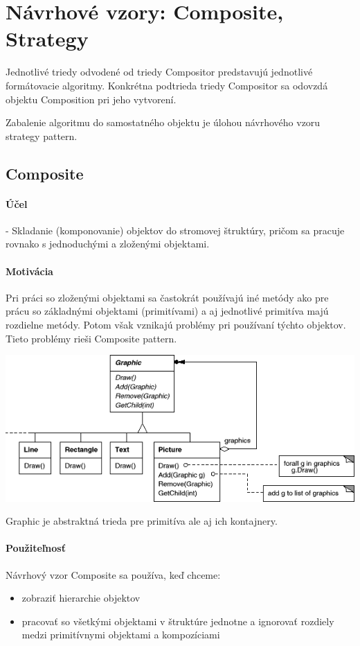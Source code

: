 \section{Návrhové vzory: Composite, Strategy}

Jednotlivé triedy odvodené od triedy Compositor predstavujú jednotlivé formátovacie algoritmy. Konkrétna podtrieda triedy Compositor sa odovzdá objektu Composition pri jeho vytvorení.

Zabalenie algoritmu do samostatného objektu je úlohou návrhového vzoru strategy pattern.
	\subsection{Composite}
		\paragraph{Účel}
			 - Skladanie (komponovanie) objektov do stromovej štruktúry, pričom sa pracuje rovnako s jednoduchými a zloženými objektami.

		\paragraph{Motivácia}
		Pri práci so zloženými objektami sa častokrát používajú iné metódy ako pre prácu so základnými objektami (primitívami) a aj jednotlivé primitíva majú rozdielne metódy. Potom však vznikajú problémy pri používaní týchto objektov. Tieto problémy rieši Composite pattern.


		\includegraphics[width=.9\textwidth]{images/composite1}

		Graphic je abstraktná trieda pre primitíva ale aj ich kontajnery.


		\paragraph{Použiteľnosť}
		Návrhový vzor Composite sa používa, keď chceme:
			\begin{itemize}
				\item zobraziť hierarchie objektov
				\item pracovať so všetkými objektami v štruktúre jednotne a ignorovať rozdiely medzi primitívnymi objektami a kompozíciami
			\end{itemize}
